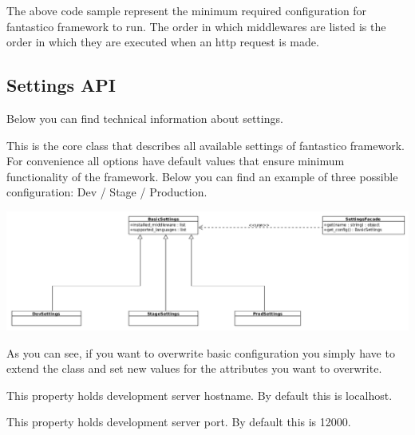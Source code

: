 \documentclass[letterpaper,10pt,english]{sphinxmanual}
\begin{document}
The above code sample represent the minimum required configuration for fantastico framework to run. The order in which middlewares
are listed is the order in which they are executed when an http request is made.


\subsection{Settings API}
\label{get_started/settings:settings-api}
Below you can find technical information about settings.

\begin{fulllineitems}
\label{get_started/settings:fantastico.settings.BasicSettings}
This is the core class that describes all available settings of fantastico framework. For convenience all options
have default values that ensure minimum functionality of the framework. Below you can find an example of three possible 
configuration: Dev / Stage / Production.

\includegraphics{settings.png}

As you can see, if you want to overwrite basic configuration you simply have to extend the class and set new values
for the attributes you want to overwrite.

\begin{fulllineitems}
\label{get_started/settings:fantastico.settings.BasicSettings.dev_server_host}
This property holds development server hostname. By default this is localhost.

\end{fulllineitems}


\begin{fulllineitems}
\label{get_started/settings:fantastico.settings.BasicSettings.dev_server_port}
This property holds development server port. By default this is 12000.


\end{fulllineitems}
\end{fulllineitems}
\end{document}
